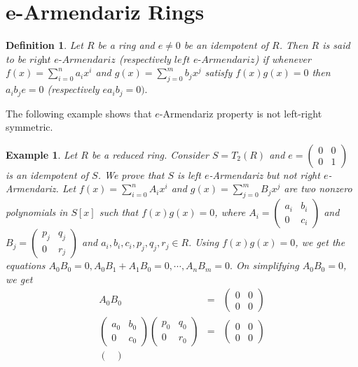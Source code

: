 \documentclass[10pt,a4paper]{amsart}
\newtheorem{definition}{Definition}[section]
\newtheorem{example}{Example}[section]
\numberwithin{equation}{section}
\begin{document}
	\section{\textbf{e-Armendariz Rings}}
	\begin{definition}
		Let $R$ be a ring and $e\ne 0$ be an idempotent of $R$. Then $R$ is said to be $\textit{right e-Armendariz}$ (respectively $\textit{left e-Armendariz}$) if whenever $f(x)=\displaystyle\sum_{i=0}^{n}a_ix^i$ and $g(x)=\displaystyle\sum_{j=0}^{m}b_jx^j$ satisfy $f(x)g(x)=0$ then $a_ib_je=0$ (respectively $ea_ib_j=0).$
		\end{definition}
The following example shows that $e$-Armendariz property is not left-right symmetric.
\begin{example}
	Let $R$ be a reduced ring. Consider $S=T_2(R)$ and $e=\begin{pmatrix}
		0&0\\0&1
	\end{pmatrix}$ is an idempotent of $S$. We prove that $S$ is left $e$-Armendariz but not right $e$-Armendariz. Let $f(x)=\sum_{i=0}^nA_ix^i$ and $g(x)=\sum_{j=0}^mB_jx^j$ are two nonzero polynomials in $S[x]$ such that $f(x)g(x)=0$, where $A_i=\begin{pmatrix}
	a_i&b_i\\0&c_i
	\end{pmatrix}$ and $B_j=\begin{pmatrix}
	p_j&q_j\\0&r_j
	\end{pmatrix}$ and $a_i,b_i,c_i,p_j,q_j,r_j\in R.$ Using $f(x)g(x)=0$, we get the equations $A_0B_0=0, A_0B_1+A_1B_0=0,\cdots,A_nB_m=0.$ On simplifying $A_0B_0=0$, we get\begin{eqnarray*}
	A_0B_0 &=&
	\begin{pmatrix}
		0 & 0 \\ 0 & 0
	\end{pmatrix}\\
	\begin{pmatrix}
		a_0 & b_0 \\ 0 & c_0
	\end{pmatrix}
	\begin{pmatrix}
		p_0 & q_0 \\ 0 & r_0
	\end{pmatrix}&=&\begin{pmatrix}
	0 & 0 \\ 0 & 0
	\end{pmatrix} \\
	\begin{pmatrix}

\end{pmatrix}
\end{eqnarray*}
\end{example}
\end{document}
